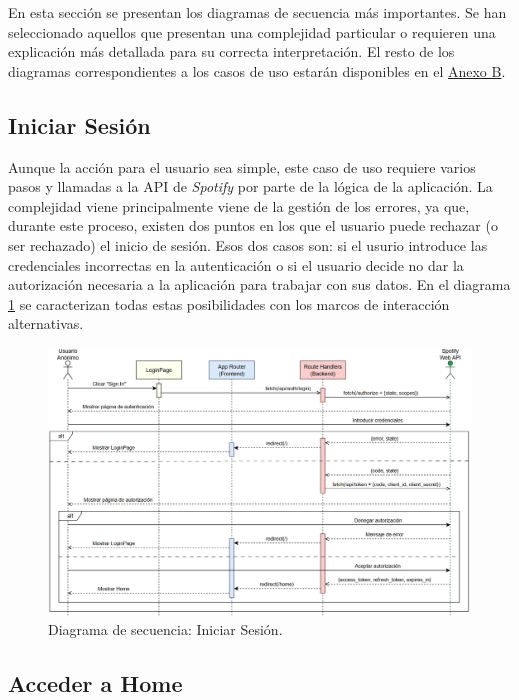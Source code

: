 En esta sección se presentan los diagramas de secuencia más importantes. Se han seleccionado aquellos que presentan una complejidad particular o requieren una explicación más detallada para su correcta interpretación. El resto de los diagramas correspondientes a los casos de uso estarán disponibles en el \hyperref[ch:anexoB]{Anexo B}.

\subsection*{Iniciar Sesión}

Aunque la acción para el usuario sea simple, este caso de uso requiere varios pasos y llamadas a la API de \textit{Spotify} por parte de la lógica de la aplicación. La complejidad viene principalmente viene de la gestión de los errores, ya que, durante este proceso, existen dos puntos en los que el usuario puede rechazar (o ser rechazado) el inicio de sesión. Esos dos casos son: si el usurio introduce las credenciales incorrectas en la autenticación o si el usuario decide no dar la autorización necesaria a la aplicación para trabajar con sus datos. En el diagrama \ref{fig:ds_iniciar_sesion} se caracterizan todas estas posibilidades con los marcos de interacción alternativas.

\begin{figure}[H]
    \centering
    \includegraphics[width=\textwidth]{figures/diagramas_secuencia/ds_iniciar_sesion.png}
    \caption{Diagrama de secuencia: Iniciar Sesión.}
    \label{fig:ds_iniciar_sesion}
\end{figure}

\subsection*{Acceder a Home}

